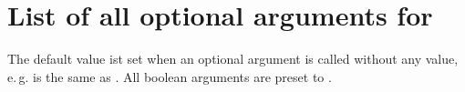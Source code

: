 \documentclass[fontsize=11pt,english,BCOR=10mm,DIV=12,bibliography=totoc,parskip=false,
   headings=small, headinclude=false,footinclude=false,oneside]{pst-doc}
\begin{document}
\clearpage
\section{List of all optional arguments for }

The default value ist set when an optional argument is called without any value,
e.\,g.  is the same as .
All boolean arguments are preset to \false.




\nocite{*}
\bgroup
\RaggedRight
\printbibliography
\egroup

\printindex
\end{document}
